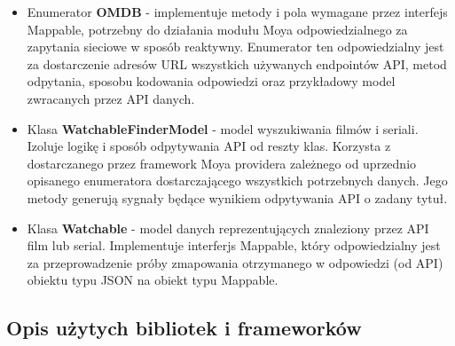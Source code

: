 \documentclass[12pt,oneside,a4paper]{report}
\begin{document}
\begin{itemize}
	\item Enumerator \textbf{OMDB} - implementuje metody i pola wymagane przez interfejs Mappable, potrzebny do działania modułu Moya odpowiedzialnego za zapytania sieciowe w sposób reaktywny. Enumerator ten odpowiedzialny jest za dostarczenie adresów URL wszystkich używanych endpointów API, metod odpytania, sposobu kodowania odpowiedzi oraz przykładowy model zwracanych przez API danych.   
	\item Klasa \textbf{WatchableFinderModel} - model wyszukiwania filmów i seriali. Izoluje logikę i sposób odpytywania API od reszty klas. Korzysta z dostarczanego przez framework Moya providera zależnego od uprzednio opisanego enumeratora dostarczającego wszystkich potrzebnych danych. Jego metody generują sygnały będące wynikiem odpytywania API o zadany tytuł. 
	\item Klasa \textbf{Watchable} - model danych reprezentujących znaleziony przez API film lub serial. Implementuje interferjs Mappable, który odpowiedzialny jest za przeprowadzenie próby zmapowania otrzymanego w odpowiedzi (od API) obiektu typu JSON na obiekt typu Mappable.
\end{itemize}
\pagebreak
\subsection{Opis użytych bibliotek i frameworków}
\end{document}
